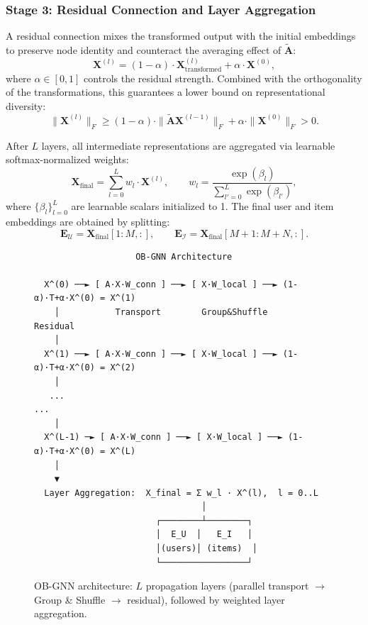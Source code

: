 \subsubsection{Stage 3: Residual Connection and Layer Aggregation}

A residual connection mixes the transformed output with the initial embeddings to preserve node identity and counteract the averaging effect of $\tilde{\mathbf{A}}$:
\begin{equation}
    \mathbf{X}^{(l)} = (1 - \alpha) \cdot \mathbf{X}_{\text{transformed}}^{(l)} + \alpha \cdot \mathbf{X}^{(0)},
\end{equation}
where $\alpha \in [0, 1]$ controls the residual strength. Combined with the orthogonality of the transformations, this guarantees a lower bound on representational diversity:
\begin{equation}
    \|\mathbf{X}^{(l)}\|_F \geq (1 - \alpha) \cdot \|\tilde{\mathbf{A}} \mathbf{X}^{(l-1)}\|_F + \alpha \cdot \|\mathbf{X}^{(0)}\|_F > 0.
\end{equation}

After $L$ layers, all intermediate representations are aggregated via learnable softmax-normalized weights:
\begin{equation}
    \mathbf{X}_{\text{final}} = \sum_{l=0}^{L} w_l \cdot \mathbf{X}^{(l)}, \qquad
    w_l = \frac{\exp(\beta_l)}{\sum_{l'=0}^{L} \exp(\beta_{l'})},
\end{equation}
where $\{\beta_l\}_{l=0}^{L}$ are learnable scalars initialized to 1. The final user and item embeddings are obtained by splitting:
\begin{equation}
    \mathbf{E}_{\mathcal{U}} = \mathbf{X}_{\text{final}}[1:M, :], \qquad \mathbf{E}_{\mathcal{I}} = \mathbf{X}_{\text{final}}[M+1:M+N, :].
\end{equation}

\begin{figure}[h]
\centering
\begin{verbatim}
                    OB-GNN Architecture

  X^(0) ──► [ A·X·W_conn ] ──► [ X·W_local ] ──► (1-α)·T+α·X^(0) = X^(1)
    │           Transport        Group&Shuffle       Residual
    │
  X^(1) ──► [ A·X·W_conn ] ──► [ X·W_local ] ──► (1-α)·T+α·X^(0) = X^(2)
    │
   ...                                                       ...
    │
  X^(L-1) ─► [ A·X·W_conn ] ──► [ X·W_local ] ──► (1-α)·T+α·X^(0) = X^(L)
    │
    ▼
  Layer Aggregation:  X_final = Σ w_l · X^(l),  l = 0..L
                                 │
                        ┌────────┴────────┐
                        │  E_U  │   E_I   │
                        │(users)│ (items)  │
                        └─────────────────┘
\end{verbatim}
\caption{OB-GNN architecture: $L$ propagation layers (parallel transport $\to$ Group \& Shuffle $\to$ residual), followed by weighted layer aggregation.}
\label{fig:architecture}
\end{figure}


